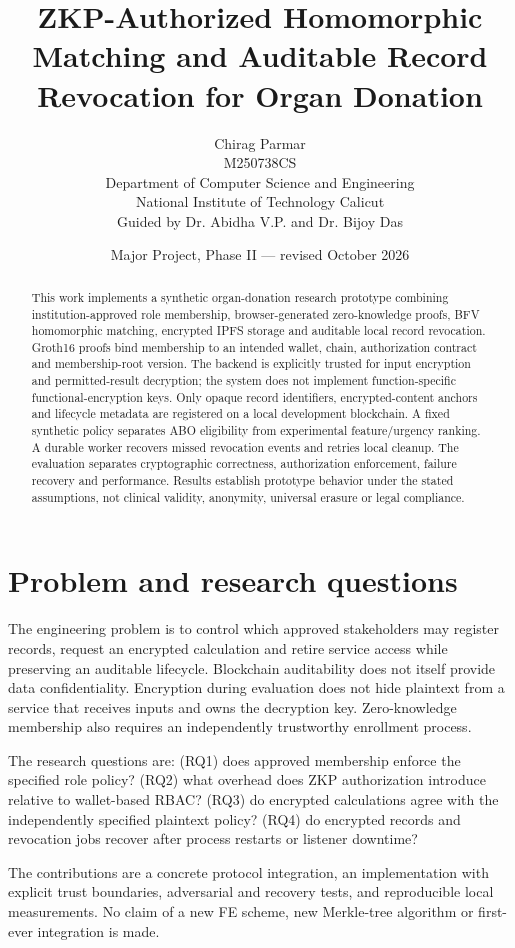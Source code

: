 \documentclass[11pt,a4paper]{article}
\title{ZKP-Authorized Homomorphic Matching and Auditable Record Revocation for Organ Donation}
\author{Chirag Parmar\\M250738CS\\Department of Computer Science and Engineering\\National Institute of Technology Calicut\\Guided by Dr. Abidha V.P. and Dr. Bijoy Das}
\date{Major Project, Phase II --- revised October 2026}
\begin{document}
\maketitle
\begin{abstract}
This work implements a synthetic organ-donation research prototype combining institution-approved role membership, browser-generated zero-knowledge proofs, BFV homomorphic matching, encrypted IPFS storage and auditable local record revocation. Groth16 proofs bind membership to an intended wallet, chain, authorization contract and membership-root version. The backend is explicitly trusted for input encryption and permitted-result decryption; the system does not implement function-specific functional-encryption keys. Only opaque record identifiers, encrypted-content anchors and lifecycle metadata are registered on a local development blockchain. A fixed synthetic policy separates ABO eligibility from experimental feature/urgency ranking. A durable worker recovers missed revocation events and retries local cleanup. The evaluation separates cryptographic correctness, authorization enforcement, failure recovery and performance. Results establish prototype behavior under the stated assumptions, not clinical validity, anonymity, universal erasure or legal compliance.
\end{abstract}

\section{Problem and research questions}
The engineering problem is to control which approved stakeholders may register records, request an encrypted calculation and retire service access while preserving an auditable lifecycle. Blockchain auditability does not itself provide data confidentiality. Encryption during evaluation does not hide plaintext from a service that receives inputs and owns the decryption key. Zero-knowledge membership also requires an independently trustworthy enrollment process.

The research questions are: (RQ1) does approved membership enforce the specified role policy? (RQ2) what overhead does ZKP authorization introduce relative to wallet-based RBAC? (RQ3) do encrypted calculations agree with the independently specified plaintext policy? (RQ4) do encrypted records and revocation jobs recover after process restarts or listener downtime?

The contributions are a concrete protocol integration, an implementation with explicit trust boundaries, adversarial and recovery tests, and reproducible local measurements. No claim of a new FE scheme, new Merkle-tree algorithm or first-ever integration is made.
\end{document}
